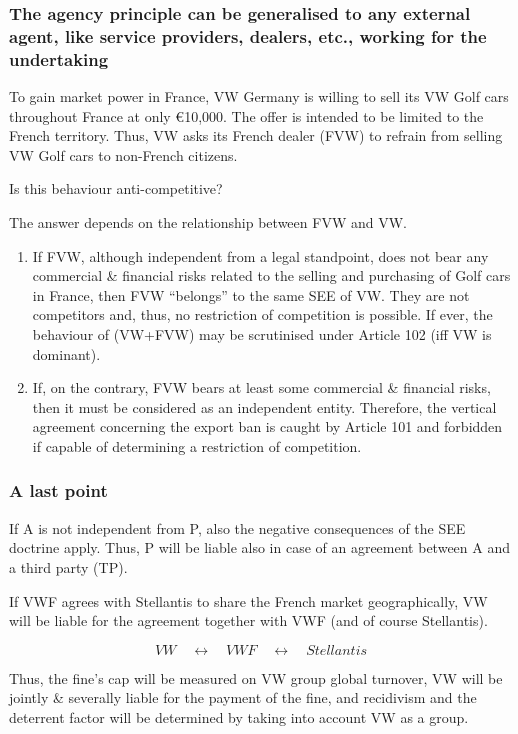         \subsubsection{The agency principle can be generalised to any external agent, like service providers, dealers, etc., working for the undertaking}

            To gain market power in France, VW Germany is willing to sell its VW Golf cars throughout France at only €10,000. The offer is intended to be limited to the French territory. Thus, VW asks its French dealer (FVW) to refrain from selling VW Golf cars to non-French citizens.

            Is this behaviour anti-competitive?
            
            The answer depends on the relationship between FVW and VW.
            \begin{enumerate}[label=\alph*.]
                \item If FVW, although independent from a legal standpoint, does not bear any commercial \& financial risks related to the selling and purchasing of Golf cars in France, then FVW ``belongs'' to the same SEE of VW. They are not competitors and, thus, no restriction of competition is possible. If ever, the behaviour of (VW+FVW) may be scrutinised under Article 102 (iff VW is dominant).
                
                \item If, on the contrary, FVW bears at least some commercial \& financial risks, then it must be considered as an independent entity. Therefore, the vertical agreement concerning the export ban is caught by Article 101 and forbidden if capable of determining a restriction of competition.
            \end{enumerate}

        \subsubsection{A last point}

            If A is not independent from P, also the negative consequences of the SEE doctrine apply. Thus, P will be liable also in case of an agreement between A and a third party (TP).

            If VWF agrees with Stellantis to share the French market geographically, VW will be liable for the agreement together with VWF (and of course Stellantis).
            
            \[
            VW \quad \longleftrightarrow \quad VWF \quad \longleftrightarrow \quad Stellantis
            \]
            
            Thus, the fine’s cap will be measured on VW group global turnover, VW will be jointly \& severally liable for the payment of the fine, and recidivism and the deterrent factor will be determined by taking into account VW as a group.
            